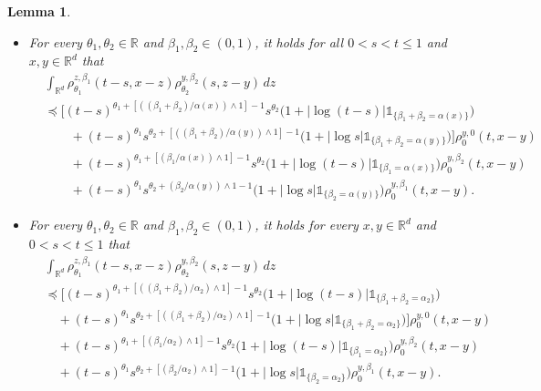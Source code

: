 \documentclass[a4paper,11pt]{amsart}
\renewcommand{\le}{\leqslant}
\newcommand{\R}{\mathds R}
\newcommand{\B}{\beta}
\newcommand{\T}{\theta}
\newcommand{\I}{\mathds 1}
\newcommand{\p}{\preceq}
\newcommand{\A}{\alpha}
\newtheorem{lemma}[theorem]{Lemma}
\theoremstyle{definition}
\begin{document}
\begin{lemma}\label{l3-2} \begin{itemize}
\item[(1)]
For every $\theta_1,\theta_2\in \R$ and  $\beta_1,\beta_2 \in (0,1)$, it holds for all $0<s<t\le 1$ and
$x,y \in \R^d$ that
\begin{equation}\label{l3-2-0}
\begin{split}
&\int_{\R^d} \rho_{\T_1}^{z,\beta_1}(t-s,x-z)\rho_{\T_2}^{y,\beta_2}(s,z-y)\, dz\\
 &\p \Big[(t-s)^{\T_1+[((\beta_1+\beta_2)/{\A(x)})\wedge 1]-1}s^{\T_2}
 \big(1+|\log (t-s)|\I_{\{\B_1+\B_2=\A(x)\}}\big)\\
 &\qquad+(t-s)^{\T_1}
s^{\T_2 +[((\beta_1+\beta_2)/{\A(y)})\wedge 1]-1}\big(1+|\log s|\I_{\{\B_1+\B_2=\A(y)\}}\big)\Big]\rho_{0}^{y,0}(t,x-y)\\
&\qquad +(t-s)^{\T_1+[({\beta_1}/{\A(x)})\wedge 1]-1}s^{\T_2}
\big(1+|\log (t-s)|\I_{\{\B_1=\A(x)\}}\big)\rho_{0}^{y,\beta_2}(t,x-y)\\
&\qquad+(t-s)^{\T_1}s^{\T_2+({\beta_2}/{\A(y)})\wedge 1 -1}
\big(1+|\log s|\I_{\{\B_2=\A(y)\}}\big)\rho_0^{y,\beta_1}(t,x-y).
\end{split}
\end{equation}

\item[(2)] For every $\theta_1,\theta_2\in \R$ and  $\beta_1,\beta_2 \in (0,1)$, it holds
for every $x,y \in \R^d$ and $0<s<t\le 1$ that
\begin{equation}\label{l3-2-1}
\begin{split}
&\int_{\R^d} \rho_{\T_1}^{z,\beta_1}(t-s,x-z)\rho_{\T_2}^{y,\beta_2}(s,z-y)\, dz\\
 &\p \Big[(t-s)^{\T_1+[((\beta_1+\beta_2)/{\A_2})\wedge 1]-1}s^{\T_2}\big(1+|\log (t-s)|\I_{\{\B_1+\B_2=\A_2\}}\big)\\
 &\quad+(t-s)^{\T_1}
s^{\T_2 +[((\beta_1+\beta_2)/{\A_2})\wedge 1]-1}\big(1+|\log s|\I_{\{\B_1+\B_2=\A_2\}}\big)\Big]\rho_{0}^{y,0}(t,x-y)\\
&\quad +(t-s)^{\T_1+[({\beta_1}/{\A_2})\wedge 1]-1}s^{\T_2}\big(1+|\log (t-s)|\I_{\{\B_1=\A_2\}}\big)\rho_{0}^{y,\beta_2}(t,x-y)\\
&\quad+(t-s)^{\T_1}s^{\T_2+[({\beta_2}/{\A_2})\wedge 1] -1}\big(1+|\log s|\I_{\{\B_2=\A_2\}}\big)\rho_0^{y,\beta_1}(t,x-y).
\end{split}
\end{equation}\end{itemize}
\end{lemma}
\end{document}
